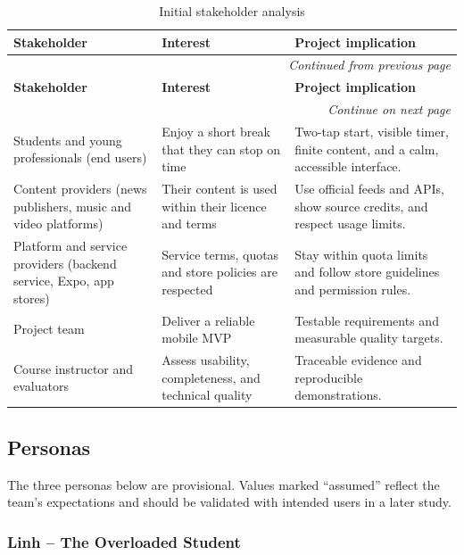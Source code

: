 \begin{longtable}{|p{3.2cm}|p{}|p{}|}
\caption{Initial stakeholder analysis}\label{tab:stakeholders}\\
\hline
\textbf{Stakeholder} & \textbf{Interest} & \textbf{Project implication} \\
\hline
\endfirsthead
\multicolumn{3}{r}{\textit{Continued from previous page}}\\[-2pt]\hline
\textbf{Stakeholder} & \textbf{Interest} & \textbf{Project implication} \\
\hline
\endhead
\multicolumn{3}{r}{\textit{Continue on next page}}\\
\endfoot
\endlastfoot
Students and young professionals (end users) & Enjoy a short break that
they can stop on time & Two-tap start, visible timer, finite content, and a
calm, accessible interface. \\
\hline
Content providers (news publishers, music and video platforms) & Their
content is used within their licence and terms & Use official feeds and
APIs, show source credits, and respect usage limits. \\
\hline
Platform and service providers (backend service, Expo, app stores) &
Service terms, quotas and store policies are respected & Stay within quota
limits and follow store guidelines and permission rules. \\
\hline
Project team & Deliver a reliable mobile MVP & Testable requirements and
measurable quality targets. \\
\hline
Course instructor and evaluators & Assess usability, completeness, and
technical quality & Traceable evidence and reproducible demonstrations. \\
\hline
\end{longtable}

\subsection{Personas}
\label{sec:personas}

The three personas below are provisional. Values marked ``assumed'' reflect
the team's expectations and should be validated with intended users in a
later study.

\subsubsection{Linh -- The Overloaded Student}

